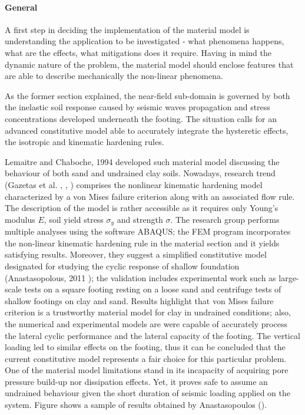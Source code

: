 \documentclass[12pt,a4paper]{report}
\begin{document}
\paragraph{General} A first step in deciding the implementation of the material model is understanding the application to be investigated - what phenomena happens, what are the effects, what mitigations does it require. Having in mind the dynamic nature of the problem, the material model should enclose features that are able to describe mechanically the non-linear phenomena. 

As the former section explained, the near-field sub-domain is governed by both the inelastic soil response caused by seismic waves propagation and stress concentrations developed underneath the footing. The situation calls for an advanced constitutive model able to accurately integrate the hysteretic effects, the isotropic and kinematic hardening rules.

Lemaitre and Chaboche, 1994 \cite{lemaitre1994mechanics} developed such material model discussing the behaviour of both sand and undrained clay soils. Nowadays, research trend (Gazetas et al. \cite{gazetas2004nonlinear}, \cite{gazetas2013nonlinear}, \cite{anastasopoulos2010soil}) comprises the nonlinear kinematic hardening model characterized by a von Mises failure criterion along with an associated flow rule. The description of the model is rather accessible as it requires only Young's modulus $E$, soil yield stress $\sigma_y$ and strength $\sigma$. The research group performs multiple analyses using the software ABAQUS; the FEM program incorporates the non-linear kinematic hardening rule in the material section and it yields satisfying results. Moreover, they suggest a simplified constitutive model designated for studying the cyclic response of shallow foundation (Anastasopolous, 2011 \cite{anastasopoulos2011simplified}); the validation includes experimental work such as large-scale tests on a square footing resting on a loose sand and centrifuge tests of shallow footings on clay and sand. Results highlight that von Mises failure criterion is a trustworthy material model for clay in undrained conditions; also, the numerical and experimental models are were capable of accurately process the lateral cyclic performance and the lateral capacity of the footing. The vertical loading led to similar effects on the footing, thus it can be concluded that the current constitutive model represents a fair choice for this particular problem. One of the material model limitations stand in its incapacity of acquiring pore pressure build-up nor dissipation effects. Yet, it proves safe to assume an undrained behaviour given the short duration of seismic loading applied on the system. Figure shows a sample of results obtained by Anastasopoulos (\cite{anastasopoulos2011simplified}).
\end{document}
